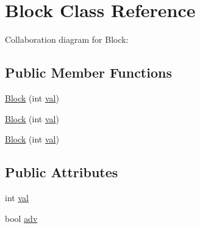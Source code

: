 \hypertarget{classBlock}{\section{Block Class Reference}
\label{classBlock}
}


Collaboration diagram for Block\-:
\subsection*{Public Member Functions}
\begin{DoxyCompactItemize}
\item 
\hyperlink{classBlock_a011e16727c6af0e3ffdb5bedaee4550e}{Block} (int \hyperlink{classBlock_aa7f0cc1c0ca66b1d5655487ebabacb6b}{val})
\item 
\hyperlink{classBlock_a011e16727c6af0e3ffdb5bedaee4550e}{Block} (int \hyperlink{classBlock_aa7f0cc1c0ca66b1d5655487ebabacb6b}{val})
\item 
\hyperlink{classBlock_a011e16727c6af0e3ffdb5bedaee4550e}{Block} (int \hyperlink{classBlock_aa7f0cc1c0ca66b1d5655487ebabacb6b}{val})
\end{DoxyCompactItemize}
\subsection*{Public Attributes}
\begin{DoxyCompactItemize}
\item 
int \hyperlink{classBlock_aa7f0cc1c0ca66b1d5655487ebabacb6b}{val}
\item 
bool \hyperlink{classBlock_aa5b4442c70728ea6f44b23f781bd7fec}{adv}
\end{DoxyCompactItemize}


